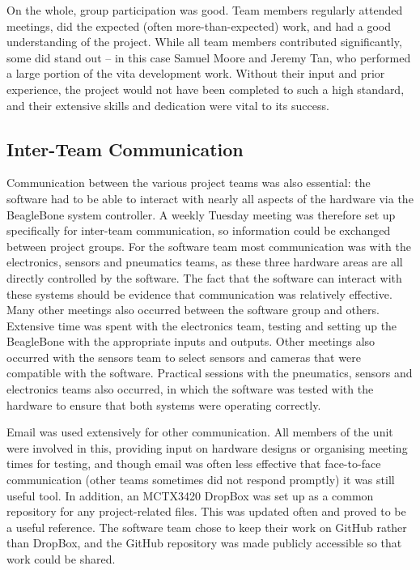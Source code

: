 On the whole, group participation was good. Team members regularly attended meetings, did the expected (often more-than-expected) work, and had a good understanding of the project. While all team members contributed significantly, some did stand out – in this case Samuel Moore and Jeremy Tan, who performed a large portion of the vita development work. Without their input and prior experience, the project would not have been completed to such a high standard, and their extensive skills and dedication were vital to its success.

\subsection{Inter-Team Communication}

Communication between the various project teams was also essential: the software had to be able to interact with nearly all aspects of the hardware via the BeagleBone system controller.  A weekly Tuesday meeting was therefore set up specifically for inter-team communication, so information could be exchanged between project groups. For the software team most communication was with the electronics, sensors and pneumatics teams, as these three hardware areas are all directly controlled by the software. The fact that the software can interact with these systems should be evidence that communication was relatively effective.
Many other meetings also occurred between the software group and others. Extensive time was spent with the electronics team, testing and setting up the BeagleBone with the appropriate inputs and outputs. Other meetings also occurred with the sensors team to select sensors and cameras that were compatible with the software. Practical sessions with the pneumatics, sensors and electronics teams also occurred, in which the software was tested with the hardware to ensure that both systems were operating correctly.


Email was used extensively for other communication. All members of the unit were involved in this, providing input on hardware designs or organising meeting times for testing, and though email was often less effective that face-to-face communication (other teams sometimes did not respond promptly) it was still useful tool. In addition, an MCTX3420 DropBox was set up as a common repository for any project-related files. This was updated often and proved to be a useful reference. The software team chose to keep their work on GitHub rather than DropBox, and the GitHub repository was made publicly accessible so that work could be shared.


